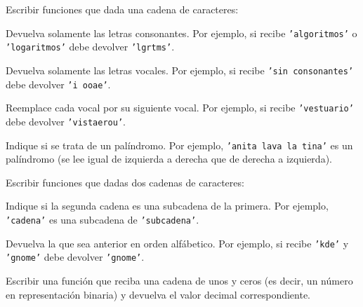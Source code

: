 \begin{ejercicio}
Escribir funciones que dada una cadena de caracteres:
\begin{partes}
\item Devuelva solamente las letras consonantes. Por ejemplo, si recibe
\texttt{'algoritmos'} o \texttt{'logaritmos'} debe devolver \texttt{'lgrtms'}.
\item Devuelva solamente las letras vocales. Por ejemplo, si recibe \texttt{'sin
consonantes'} debe devolver \texttt{'i ooae'}.
\item Reemplace cada vocal por su siguiente vocal. Por ejemplo, si recibe
\texttt{'vestuario'} debe devolver \texttt{'vistaerou'}.
\item Indique si se trata de un palíndromo. Por ejemplo, \texttt{'anita
lava la tina'} es un palíndromo (se lee igual de izquierda a derecha que de
derecha a izquierda).
\end{partes}
\end{ejercicio}


\begin{ejercicio}
Escribir funciones que dadas dos cadenas de caracteres:
\begin{partes}
\item Indique si la segunda cadena es una subcadena de la primera. Por ejemplo,
\texttt{'cadena'} es una subcadena de \texttt{'subcadena'}.
\item Devuelva la que sea anterior en orden alfábetico. Por ejemplo, si recibe
\texttt{'kde'} y \texttt{'gnome'} debe devolver \texttt{'gnome'}.
\end{partes}
\end{ejercicio}


\begin{ejercicio}
Escribir una función que reciba una cadena de unos y ceros (es decir, un
número en representación binaria) y devuelva el valor decimal
correspondiente.
\end{ejercicio}

